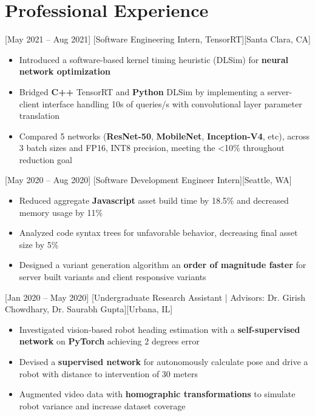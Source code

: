 \documentclass{article}
\begin{document}
\section{Professional Experience}


[May 2021 -- Aug 2021]
[Software Engineering Intern, TensorRT][Santa Clara, CA]

\begin{itemize}
    \item Introduced a software-based kernel timing heuristic (DLSim) for \textbf{neural network optimization}
    \item Bridged \textbf{C++} TensorRT and \textbf{Python} DLSim by implementing a server-client interface handling 10s of queries/s with convolutional layer parameter translation
    \item Compared 5 networks (\textbf{ResNet-50}, \textbf{MobileNet}, \textbf{Inception-V4}, etc), across 3 batch sizes and FP16, INT8 precision, meeting the <10\% throughout reduction goal
\end{itemize}

[May 2020 -- Aug 2020]
[Software Development Engineer Intern][Seattle, WA]

\begin{itemize}
    \item Reduced aggregate \textbf{Javascript} asset build time by 18.5\% and decreased memory usage by 11\%  
    \item Analyzed code syntax trees for unfavorable behavior, decreasing final asset size by 5\%
    \item Designed a variant generation algorithm an \textbf{order of magnitude faster} for server built variants and client responsive variants 
\end{itemize}

[Jan 2020 -- May 2020]
[Undergraduate Research Assistant | Advisors: Dr. Girish Chowdhary, Dr. Saurabh Gupta][Urbana, IL]
\begin{itemize}
    \item Investigated vision-based robot heading estimation with a \textbf{self-supervised network} on \textbf{PyTorch} achieving 2 degrees error 
    \item Devised a \textbf{supervised network} for autonomously calculate pose and drive a robot with distance to intervention of 30 meters
    \item Augmented video data with \textbf{homographic transformations} to simulate robot variance and increase dataset coverage
\end{itemize}
\end{document}
